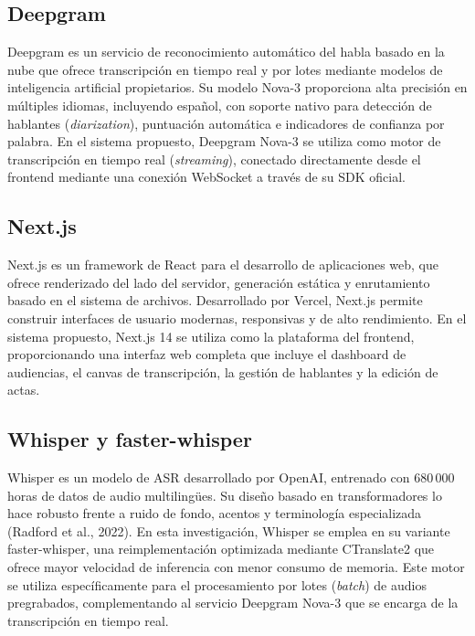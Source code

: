 \documentclass[12pt,a4paper,oneside]{report}
\begin{document}
\subsection{Deepgram}

Deepgram es un servicio de reconocimiento automático del habla basado en la nube que ofrece transcripción en tiempo real y por lotes mediante modelos de inteligencia artificial propietarios. Su modelo Nova-3 proporciona alta precisión en múltiples idiomas, incluyendo español, con soporte nativo para detección de hablantes (\textit{diarization}), puntuación automática e indicadores de confianza por palabra. En el sistema propuesto, Deepgram Nova-3 se utiliza como motor de transcripción en tiempo real (\textit{streaming}), conectado directamente desde el frontend mediante una conexión WebSocket a través de su SDK oficial.

\subsection{Next.js}

Next.js es un framework de React para el desarrollo de aplicaciones web, que ofrece renderizado del lado del servidor, generación estática y enrutamiento basado en el sistema de archivos. Desarrollado por Vercel, Next.js permite construir interfaces de usuario modernas, responsivas y de alto rendimiento. En el sistema propuesto, Next.js 14 se utiliza como la plataforma del frontend, proporcionando una interfaz web completa que incluye el dashboard de audiencias, el canvas de transcripción, la gestión de hablantes y la edición de actas.

\subsection{Whisper y faster-whisper}

Whisper es un modelo de ASR desarrollado por OpenAI, entrenado con 680\,000 horas de datos de audio multilingües. Su diseño basado en transformadores lo hace robusto frente a ruido de fondo, acentos y terminología especializada (Radford et al., 2022). En esta investigación, Whisper se emplea en su variante faster-whisper, una reimplementación optimizada mediante CTranslate2 que ofrece mayor velocidad de inferencia con menor consumo de memoria. Este motor se utiliza específicamente para el procesamiento por lotes (\textit{batch}) de audios pregrabados, complementando al servicio Deepgram Nova-3 que se encarga de la transcripción en tiempo real.
\end{document}
